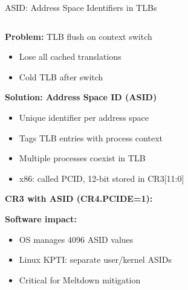 \documentclass[aspectratio=169,12pt]{beamer}
\begin{document}
\begin{frame}{ASID: Address Space Identifiers in TLBs}
\begin{columns}[T]
\begin{column}{0.48\textwidth}
\textbf{Problem:} TLB flush on context switch
\begin{itemize}
\item Lose all cached translations
\item Cold TLB after switch
\end{itemize}

\textbf{Solution: Address Space ID (ASID)}
\begin{itemize}
\item Unique identifier per address space
\item Tags TLB entries with process context
\item Multiple processes coexist in TLB
\item x86: called PCID, 12-bit stored in CR3[11:0]
\end{itemize}

\textbf{CR3 with ASID (CR4.PCIDE=1):}
\begin{center}
\end{center}

\textbf{Software impact:}
\begin{itemize}
\item OS manages 4096 ASID values
\item Linux KPTI: separate user/kernel ASIDs
\item Critical for Meltdown mitigation
\end{itemize}
\end{column}


\end{columns}
\end{frame}
\end{document}
